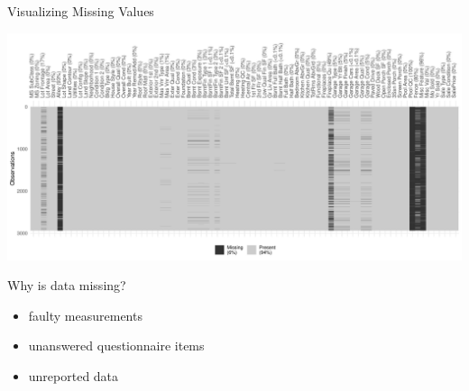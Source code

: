 \documentclass[11pt,compress,t,notes=noshow, xcolor=table]{beamer}
\begin{document}
\begin{frame}{Visualizing Missing Values}

    \begin{center}
        \includegraphics[width=\textwidth]{figure/missing_values_visualization}
    \end{center}

\end{frame}
\begin{frame}{Why is data missing? }
    \vfill
    \begin{itemize}
        \item faulty measurements
        \item unanswered questionnaire items
        \item unreported data
    \end{itemize}
    \vfill
\end{frame}
\end{document}
